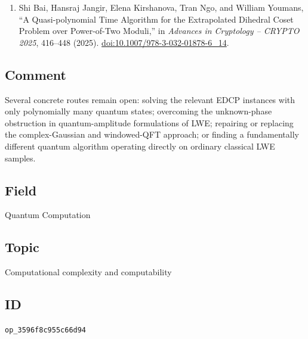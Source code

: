 \begin{enumerate}[label={},leftmargin=4.8em,labelsep=0.5em]
  \item[\textup{[BJKNY25]}]\label{ref:3596-bjkn}
  Shi Bai, Hansraj Jangir, Elena Kirshanova, Tran Ngo, and William Youmans,
``A Quasi-polynomial Time Algorithm for the Extrapolated Dihedral Coset
Problem over Power-of-Two Moduli,'' in \emph{Advances in Cryptology -- CRYPTO
2025}, 416--448 (2025).
\href{https://doi.org/10.1007/978-3-032-01878-6_14}{doi:10.1007/978-3-032-01878-6_14}.
\end{enumerate}

\subsection*{Comment}

Several concrete routes remain open: solving the relevant EDCP instances
with only polynomially many quantum states; overcoming the unknown-phase
obstruction in quantum-amplitude formulations of LWE; repairing or
replacing the complex-Gaussian and windowed-QFT approach; or finding a
fundamentally different quantum algorithm operating directly on ordinary
classical LWE samples.

\subsection*{Field}

Quantum Computation

\subsection*{Topic}

Computational complexity and computability

\subsection*{ID}

\texttt{op\_3596f8c955c66d94}

